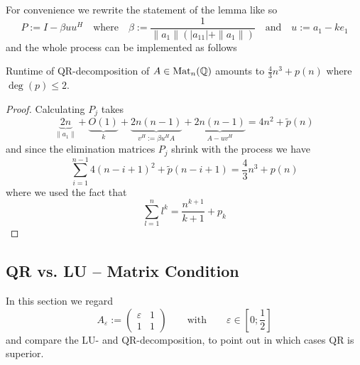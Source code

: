For convenience we rewrite the statement of the lemma like so
\[P := I - \beta uu^H \quad\text{where}\quad \beta := \frac{1}{\|a_1\|(|a_{11}| + \|a_1\|)} \quad\text{and}\quad u := a_1 - ke_1\]
and the whole process can be implemented as follows



\begin{theorem}
   Runtime of QR-decomposition of \(A \in \operatorname{Mat}_n(\mathbb{Q})\) amounts to \(\frac{4}{3}n^3 + p(n)\) where \(\deg(p) \leq 2\).
\end{theorem}
\begin{proof}
   Calculating \(P_j\) takes
   \[\underbrace{2n}_{\|a_1\|} + \underbrace{O(1)}_{k} + \underbrace{2n(n-1)}_{v^H := \beta u^H A} + \underbrace{2n(n-1)}_{A - uv^H} = 4n^2 + \widetilde{p}(n)\]
   and since the elimination matrices \(P_j\) shrink with the process we have
   \[\sum_{i=1}^{n-1} 4(n - i + 1)^2 + \widetilde{p}(n - i + 1) = \frac{4}{3}n^3 + p(n)\]
   where we used the fact that
   \[\sum_{l=1}^n l^k = \frac{n^{k+1}}{k+1} + p_k\]
\end{proof}

\subsection{QR vs. LU -- Matrix Condition}
In this section we regard
\[A_\varepsilon := \begin{pmatrix}\varepsilon & 1\\1 & 1\end{pmatrix} \qquad\text{with}\qquad \varepsilon \in \left[0; \frac{1}{2}\right]\]
and compare the LU- and QR-decomposition, to point out in which cases QR is superior.

